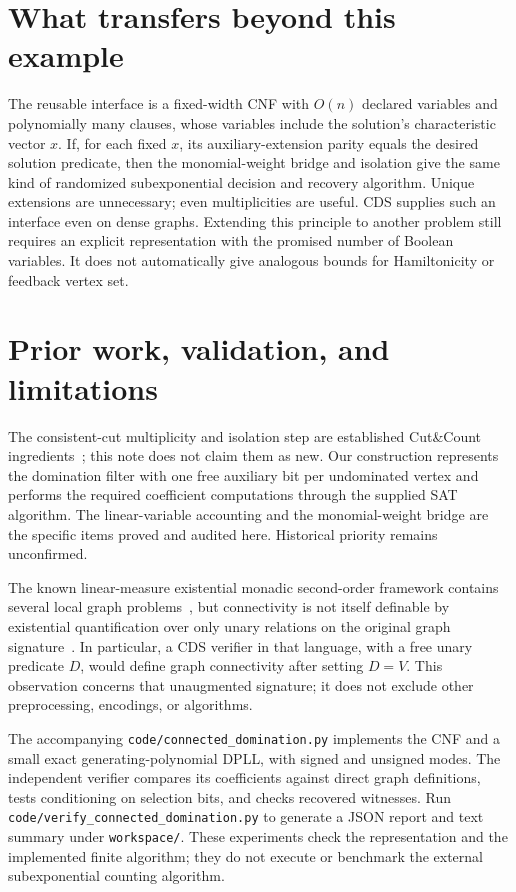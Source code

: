 \documentclass[11pt]{article}
\theoremstyle{remark}\newtheorem{remark}[theorem]{Remark}
\begin{document}
\section{What transfers beyond this example}
The reusable interface is a fixed-width CNF with $O(n)$ declared
variables and polynomially many clauses, whose variables include the
solution's characteristic vector $x$. If, for each fixed $x$, its
auxiliary-extension parity equals the desired solution predicate, then
the monomial-weight bridge and isolation give the same kind of
randomized subexponential decision and recovery algorithm. Unique
extensions are unnecessary; even multiplicities are useful.
CDS supplies such an interface even on dense graphs. Extending this
principle to another problem still requires an explicit representation
with the promised number of Boolean variables. It does not automatically
give analogous bounds for Hamiltonicity or feedback vertex set.

\section{Prior work, validation, and limitations}
The consistent-cut multiplicity and isolation step are established
Cut\&Count ingredients~\cite{cutcount}; this note does not claim them
as new. Our construction represents the domination filter with one
free auxiliary bit per undominated vertex and performs the required
coefficient computations through the supplied SAT algorithm.
The linear-variable accounting and the monomial-weight bridge are the
specific items proved and audited here. Historical priority remains
unconfirmed.

The known linear-measure existential monadic second-order framework
contains several local graph problems~\cite{linear}, but connectivity
is not itself definable by existential quantification over only unary
relations on the original graph signature~\cite{monadic}. In particular,
a CDS verifier in that language, with a free unary predicate $D$, would
define graph connectivity after setting $D=V$. This observation concerns
that unaugmented signature; it does not exclude other preprocessing,
encodings, or algorithms.

The accompanying \texttt{code/connected\_domination.py} implements the
CNF and a small exact generating-polynomial DPLL, with signed and
unsigned modes. The independent verifier compares its coefficients
against direct graph definitions, tests conditioning on selection bits,
and checks recovered witnesses. Run
\texttt{code/verify\_connected\_domination.py} to generate a JSON report
and text summary under \texttt{workspace/}. These experiments check the representation and the
implemented finite algorithm; they do not execute or benchmark the
external subexponential counting algorithm.
\end{document}
